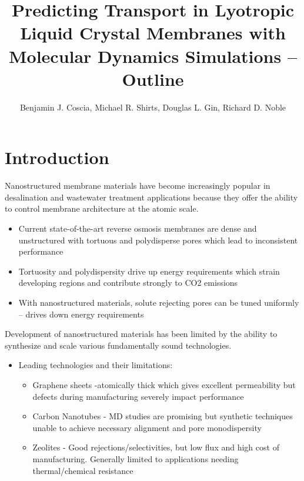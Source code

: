 \documentclass{article}
\title{Predicting Transport in Lyotropic Liquid Crystal Membranes with Molecular Dynamics Simulations -- Outline}
\author{Benjamin J. Coscia, Michael R. Shirts, Douglas L. Gin, Richard D. Noble}
\begin{document}

\maketitle
\section{Introduction}

Nanostructured membrane materials have become increasingly popular in desalination and wastewater treatment applications because they offer the ability to control membrane architecture at the atomic scale.
\begin{itemize}
	\item Current state-of-the-art reverse osmosis membranes are dense and unstructured with tortuous and polydisperse pores which lead to inconsistent performance
	\item Tortuosity and polydispersity drive up energy requirements which strain developing regions and contribute strongly to CO2 emissions
	\item With nanostructured materials, solute rejecting pores can be tuned uniformly -- drives down energy requirements
\end{itemize}

Development of nanostructured materials has been limited by the ability to synthesize and scale various fundamentally sound technologies.
\begin{itemize}
	\item Leading technologies and their limitations:
	\begin{itemize}
		\item Graphene sheets -atomically thick which gives excellent permeability but defects during manufacturing severely impact performance
		\item Carbon Nanotubes - MD studies are promising but synthetic techniques unable to achieve necessary alignment and pore monodispersity
		\item Zeolites - Good rejections/selectivities, but low flux and high cost of manufacturing. Generally limited to applications needing thermal/chemical resistance
	\end{itemize}
\end{itemize} 
\end{document}
